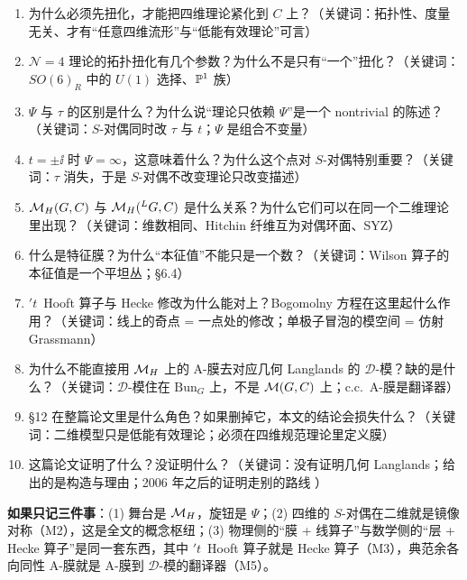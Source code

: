 \begin{enumerate}[label=\textbf{Q\arabic*.}]
\item 为什么必须先扭化，才能把四维理论紧化到 $C$ 上？（关键词：拓扑性、度量无关、才有“任意四维流形”与“低能有效理论”可言）
\item $\mathcal{N}=4$ 理论的拓扑扭化有几个参数？为什么不是只有“一个”扭化？（关键词：$SO(6)_R$ 中的 $U(1)$ 选择、$\mathbb{P}^1$ 族）
\item $\Psi$ 与 $\tau$ 的区别是什么？为什么说“理论只依赖 $\Psi$”是一个 nontrivial 的陈述？（关键词：$S$-对偶同时改 $\tau$ 与 $t$；$\Psi$ 是组合不变量）
\item $t=\pm\ii$ 时 $\Psi=\infty$，这意味着什么？为什么这个点对 $S$-对偶特别重要？（关键词：$\tau$ 消失，于是 $S$-对偶不改变理论只改变描述）
\item $\mathcal{M}_H(G,C)$ 与 $\mathcal{M}_H({}^{L}G,C)$ 是什么关系？为什么它们可以在同一个二维理论里出现？（关键词：维数相同、Hitchin 纤维互为对偶环面、SYZ）
\item 什么是特征膜？为什么“本征值”不能只是一个数？（关键词：Wilson 算子的本征值是一个平坦丛；\S6.4）
\item $'t$~Hooft 算子与 Hecke 修改为什么能对上？Bogomolny 方程在这里起什么作用？（关键词：线上的奇点 = 一点处的修改；单极子冒泡的模空间 = 仿射 Grassmann）
\item 为什么不能直接用 $\mathcal{M}_H$ 上的 A-膜去对应几何 Langlands 的 $\mathcal{D}$-模？缺的是什么？（关键词：$\mathcal{D}$-模住在 $\mathrm{Bun}_G$ 上，不是 $\mathcal{M}(G,C)$ 上；c.c.\ A-膜是翻译器）
\item \S12 在整篇论文里是什么角色？如果删掉它，本文的结论会损失什么？（关键词：二维模型只是低能有效理论；必须在四维规范理论里定义膜）
\item 这篇论文证明了什么？没证明什么？（关键词：没有证明几何 Langlands；给出的是构造与理由；2006 年之后的证明走别的路线 \pC）
\end{enumerate}

\begin{keyidea}
\textbf{如果只记三件事}：(1) 舞台是 $\mathcal{M}_H$，旋钮是 $\Psi$；(2) 四维的 $S$-对偶在二维就是镜像对称（M2），这是全文的概念枢纽；(3) 物理侧的“膜 + 线算子”与数学侧的“层 + Hecke 算子”是同一套东西，其中 $'t$~Hooft 算子就是 Hecke 算子（M3），典范余各向同性 A-膜就是 A-膜到 $\mathcal{D}$-模的翻译器（M5）。
\end{keyidea}
